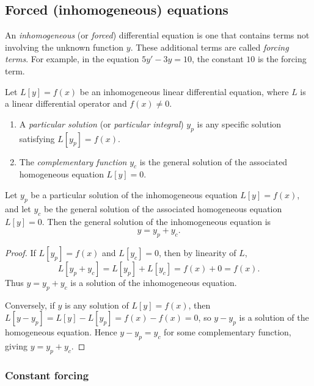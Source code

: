 \documentclass[a4paper]{article}
\begin{document}
\subsection{Forced (inhomogeneous) equations}

\begin{defi}
  An \emph{inhomogeneous} (or \emph{forced}) differential equation is one that contains terms not involving the unknown function $y$. These additional terms are called \emph{forcing terms}. For example, in the equation $5y' - 3y = 10$, the constant $10$ is the forcing term.
\end{defi}

\begin{defi}
  Let $L[y] = f(x)$ be an inhomogeneous linear differential equation, where $L$ is a linear differential operator and $f(x) \neq 0$.
  \begin{enumerate}
    \item A \emph{particular solution} (or \emph{particular integral}) $y_p$ is any specific solution satisfying $L[y_p] = f(x)$.
    \item The \emph{complementary function} $y_c$ is the general solution of the associated homogeneous equation $L[y] = 0$.
  \end{enumerate}
\end{defi}

\begin{prop}\label{prop:superposition}
  Let $y_p$ be a particular solution of the inhomogeneous equation $L[y] = f(x)$, and let $y_c$ be the general solution of the associated homogeneous equation $L[y] = 0$. Then the general solution of the inhomogeneous equation is
  \[
    y = y_p + y_c.
  \]
\end{prop}

\begin{proof}
  If $L[y_p] = f(x)$ and $L[y_c] = 0$, then by linearity of $L$,
  \[
    L[y_p + y_c] = L[y_p] + L[y_c] = f(x) + 0 = f(x).
  \]
  Thus $y = y_p + y_c$ is a solution of the inhomogeneous equation.

  Conversely, if $y$ is any solution of $L[y] = f(x)$, then $L[y - y_p] = L[y] - L[y_p] = f(x) - f(x) = 0$, so $y - y_p$ is a solution of the homogeneous equation. Hence $y - y_p = y_c$ for some complementary function, giving $y = y_p + y_c$.
\end{proof}

\subsubsection{Constant forcing}
\end{document}
